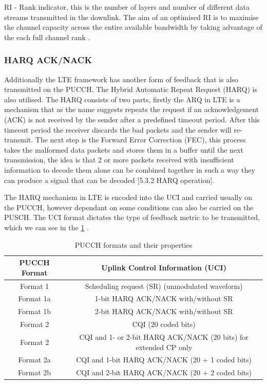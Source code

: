 \documentclass{article}
\begin{document}
RI - Rank indicator,  this is the number of layers and number of different data streams transmitted in the downlink. The aim of an optimised RI is to maximise the channel capacity across the entire available bandwidth by taking advantage of the each full channel rank  \cite{csi_defs}. 

\subsubsection{HARQ ACK/NACK}

Additionally the LTE framework has another form of feedback that is also transmitted on the PUCCH. The Hybrid Automatic Repeat Request (HARQ) is also utilised. The HARQ consists of two parts, firstly the ARQ in LTE is a mechanism that as the name suggests repeats the request if an acknowledgement (ACK) is not received by the sender after a predefined timeout period.  After this timeout period the receiver discards the bad packets and the sender will re-transmit. The next step is the Forward Error Correction (FEC), this process takes the malformed data packets and stores them in a buffer until the next transmission, the idea is that 2 or more packets received with insufficient information to decode them alone can be combined together in such a way they can produce a signal that can be decoded \cite{3gpp36321}[5.3.2 HARQ operation].

The HARQ mechanism in LTE is encoded into the UCI and carried usually on the PUCCH, however dependant on some conditions can also be carried on the PUSCH. The UCI format dictates the type of feedback metric to be transmitted, which we can see in the \cref{tab:pucch_formats} \cite[Section 17.3.1.2]{umts_sesia}. 

\begin{table}[h]
\centering
\begin{tabular}{||c| c||} 
\hline
PUCCH Format & Uplink Control Information (UCI) \\ [0.1ex] 
\hline\hline
Format 1 & Scheduling request (SR) (unmodulated waveform)\\ 
\hline
Format 1a & 1-bit HARQ ACK/NACK with/without SR\\
\hline
Format 1b & 2-bit HARQ ACK/NACK with/without SR\\
\hline
Format 2 &  CQI (20 coded bits)\\
\hline
Format 2 & CQI and 1- or 2-bit HARQ ACK/NACK (20 bits) for extended CP only\\
\hline
Format 2a & CQI and 1-bit HARQ ACK/NACK (20 + 1 coded bits)\\
\hline
Format 2b & CQI and 2-bit HARQ ACK/NACK (20 + 2 coded bits)\\
\hline
\end{tabular}
\caption{PUCCH formats and their properties}
\label{tab:pucch_formats}
\end{table}
\end{document}
